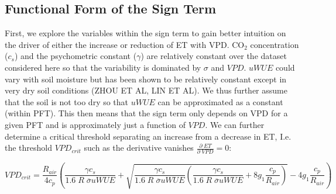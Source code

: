 \documentclass[draft,linenumbers]{agujournal}
\begin{document}
\subsection{Functional Form of the Sign Term}
\label{sign_term}
First, we explore the variables within the sign term to gain better intuition on the driver of either the increase or reduction of ET with VPD. CO$_2$ concentration ($c_s$) and the psychometric constant ($\gamma$) are relatively constant over the dataset considered here so that the variability is dominated by $\sigma$ and $VPD$. $uWUE$ could vary with soil moisture but has been shown to be relatively constant except in very dry soil conditions  (ZHOU ET AL, LIN ET AL). We thus further assume that the soil is not too dry so that $uWUE$ can be approximated as a constant (within PFT). This then means that the sign term only depends on VPD for a given PFT and is approximately just a function of $VPD$. We can further determine a critical threshold separating an increase from a decrease in ET, I.e. the threshold $VPD_{crit}$ such as the derivative vanishes $\frac{\partial \; ET}{\partial \; VPD} = 0$:

\begin{linenomath*}
  \begin{equation}
VPD_{crit} = \frac{R_{air}}{4 c_p} \left( \frac{\gamma c_s}{1.6\; R \; \overline{\sigma} uWUE} + \sqrt{\frac{\gamma c_s}{1.6\; R \; \overline{\sigma} uWUE}\left( \frac{\gamma c_s}{1.6\; R \; \overline{\sigma} uWUE} + 8 g_1 \frac{c_p}{R_{air}}\right)} - 4 g_1 \frac{c_p}{R_{air}} \right)
\label{vpd_min_et}
  \end{equation}
\end{linenomath*}
\end{document}
